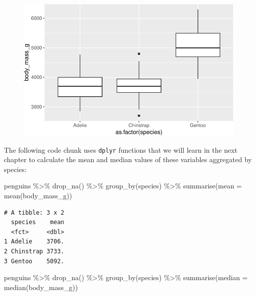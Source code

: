 \documentclass[
  letterpaper,
  DIV=11,
  numbers=noendperiod]{scrreprt}
\newenvironment{Shaded}{\begin{snugshade}}{\end{snugshade}}
\newcommand{\AttributeTok}[1]{\textcolor[rgb]{0.40,0.45,0.13}{#1}}
\newcommand{\FunctionTok}[1]{\textcolor[rgb]{0.28,0.35,0.67}{#1}}
\newcommand{\NormalTok}[1]{\textcolor[rgb]{0.00,0.23,0.31}{#1}}
\newcommand{\SpecialCharTok}[1]{\textcolor[rgb]{0.37,0.37,0.37}{#1}}
\begin{document}
\begin{figure}[H]

{\centering \includegraphics{./02-probdist_files/figure-pdf/unnamed-chunk-3-1.pdf}

}

\end{figure}

The following code chunk uses \texttt{dplyr} functions that we will
learn in the next chapter to calculate the mean and median values of
these variables aggregated by species:

\begin{Shaded}
\begin{Highlighting}[]
\NormalTok{penguins }\SpecialCharTok{\%\textgreater{}\%} \FunctionTok{drop\_na}\NormalTok{() }\SpecialCharTok{\%\textgreater{}\%} \FunctionTok{group\_by}\NormalTok{(species) }\SpecialCharTok{\%\textgreater{}\%} \FunctionTok{summarise}\NormalTok{(}\AttributeTok{mean =} \FunctionTok{mean}\NormalTok{(body\_mass\_g))}
\end{Highlighting}
\end{Shaded}

\begin{verbatim}
# A tibble: 3 x 2
  species    mean
  <fct>     <dbl>
1 Adelie    3706.
2 Chinstrap 3733.
3 Gentoo    5092.
\end{verbatim}

\begin{Shaded}
\begin{Highlighting}[]
\NormalTok{penguins }\SpecialCharTok{\%\textgreater{}\%} \FunctionTok{drop\_na}\NormalTok{()  }\SpecialCharTok{\%\textgreater{}\%} \FunctionTok{group\_by}\NormalTok{(species) }\SpecialCharTok{\%\textgreater{}\%} \FunctionTok{summarise}\NormalTok{(}\AttributeTok{median =} \FunctionTok{median}\NormalTok{(body\_mass\_g))}
\end{Highlighting}
\end{Shaded}
\end{document}
